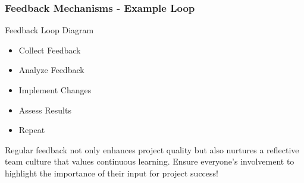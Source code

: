 \documentclass[aspectratio=169]{beamer}
\begin{document}
\begin{frame}[fragile]
    \frametitle{Feedback Mechanisms - Example Loop}
    
    \begin{block}{Feedback Loop Diagram}
        \begin{itemize}
            \item Collect Feedback 
            \item Analyze Feedback 
            \item Implement Changes 
            \item Assess Results 
            \item Repeat
        \end{itemize}
    \end{block}
    
    Regular feedback not only enhances project quality but also nurtures a reflective team culture that values continuous learning. Ensure everyone's involvement to highlight the importance of their input for project success!
\end{frame}
\end{document}
